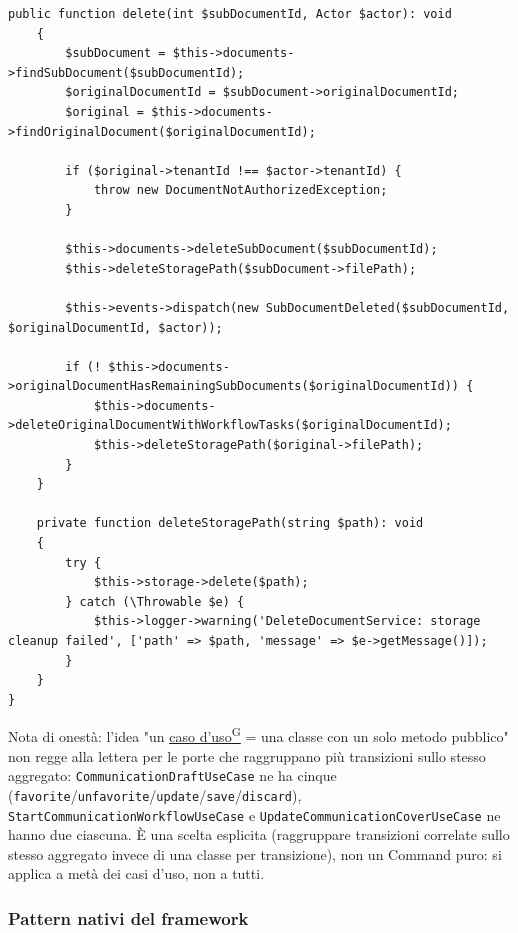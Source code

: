 \documentclass[a4paper,12pt]{article}
\providecommand{\glslink}[2]{\href{https://alittlebyte-19.github.io/Documentazione/glossario.html\#gls-#1}{\underline{#2}\textsuperscript{\scriptsize G}}}
\begin{document}
\begin{sloppypar}
\begin{lstlisting}[style=phplisting, caption={DeleteDocumentService -- caso d'uso applicativo con una singola porta primaria (delete())}]
    public function delete(int $subDocumentId, Actor $actor): void
    {
        $subDocument = $this->documents->findSubDocument($subDocumentId);
        $originalDocumentId = $subDocument->originalDocumentId;
        $original = $this->documents->findOriginalDocument($originalDocumentId);

        if ($original->tenantId !== $actor->tenantId) {
            throw new DocumentNotAuthorizedException;
        }

        $this->documents->deleteSubDocument($subDocumentId);
        $this->deleteStoragePath($subDocument->filePath);

        $this->events->dispatch(new SubDocumentDeleted($subDocumentId, $originalDocumentId, $actor));

        if (! $this->documents->originalDocumentHasRemainingSubDocuments($originalDocumentId)) {
            $this->documents->deleteOriginalDocumentWithWorkflowTasks($originalDocumentId);
            $this->deleteStoragePath($original->filePath);
        }
    }

    private function deleteStoragePath(string $path): void
    {
        try {
            $this->storage->delete($path);
        } catch (\Throwable $e) {
            $this->logger->warning('DeleteDocumentService: storage cleanup failed', ['path' => $path, 'message' => $e->getMessage()]);
        }
    }
}
\end{lstlisting}

Nota di onestà: l'idea "un \glslink{caso-d-uso-uc}{caso d'uso} = una classe con un solo metodo pubblico" non regge alla lettera per le porte che raggruppano più transizioni sullo stesso aggregato: \texttt{CommunicationDraftUseCase} ne ha cinque (\texttt{favorite}/\texttt{unfavorite}/\texttt{update}/\texttt{save}/\texttt{discard}), \texttt{StartCommunicationWorkflowUseCase} e \texttt{UpdateCommunicationCoverUseCase} ne hanno due ciascuna. È una scelta esplicita (raggruppare transizioni correlate sullo stesso aggregato invece di una classe per transizione), non un Command puro: si applica a metà dei casi d'uso, non a tutti.

\subsubsection{Pattern nativi del framework}


\end{sloppypar}
\end{document}
